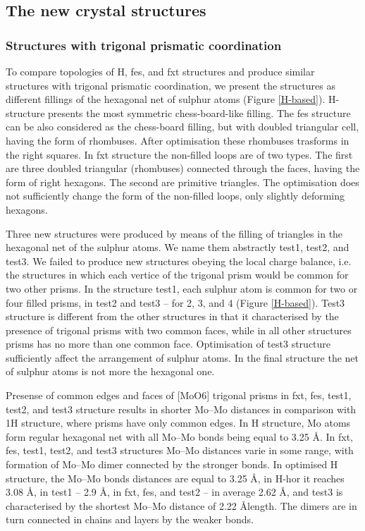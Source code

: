 \documentclass[a4paperm]{article}
\begin{document}
		\subsection{The new crystal structures}


\subsubsection{Structures with trigonal prismatic coordination}

To compare topologies of H, fes, and fxt structures and produce similar structures with trigonal prismatic coordination, we present the structures as different fillings of the hexagonal net of sulphur atoms (Figure \ref{H-based}).
H-structure presents the most symmetric chess-board-like filling.
The fes structure can be also considered as the chess-board filling, but with doubled triangular cell, having the form of rhombuses.
After optimisation these rhombuses trasforms in the right squares.
In fxt structure the non-filled loops are of two types.
The first are three doubled triangular (rhombuses) connected through the faces, having the form of right hexagons.
The second are primitive triangles.
The optimisation does not sufficiently change the form of the non-filled loops, only slightly deforming hexagons.


Three new structures were produced by means of the filling of triangles in the hexagonal net of the sulphur atoms.
We name them abstractly test1, test2, and test3.
We failed to produce new structures obeying the local charge balance, i.e. the structures in which each vertice of the trigonal prism would be common for two other prisms.
In the structure test1, each sulphur atom is common for two or four filled prisms, in test2 and test3 – for 2, 3, and 4 (Figure \ref{H-based}).
Test3 structure is different from the other structures in that it characterised by the presence of trigonal prisms with two common faces, while in all other structures prisms has no more than one common face.
Optimisation of test3 structure sufficiently affect the arrangement of sulphur atoms.
In the final structure the net of sulphur atoms is not more the hexagonal one.

Presense of common edges and faces of [MoO6] trigonal prisms in fxt, fes, test1, test2, and test3 structure results in shorter Mo--Mo distances in comparison with 1H structure, where prisms have only common edges.
In H structure, Mo atoms form regular hexagonal net with all Mo--Mo bonds being equal to 3.25 \AA.
In fxt, fes, test1, test2, and test3 structures Mo--Mo distances varie in some range, with formation of Mo--Mo dimer connected by the stronger bonds.
In optimised H structure, the Mo--Mo bonds distances are equal to 3.25 \AA, in H-hor it reaches 3.08 \AA, in test1 -- 2.9 \AA, in fxt, fes, and test2 -- in average 2.62 \AA, and test3 is characterised by the shortest Mo--Mo distance of 2.22 \AA length. 
The dimers are in turn connected in chains and layers by the weaker bonds.
\end{document}
